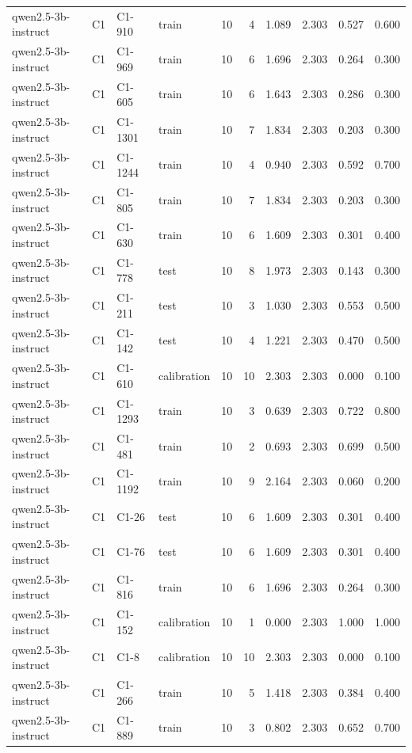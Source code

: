 \begin{table}
\begin{tabular}{llllrrrrrr}
qwen2.5-3b-instruct & C1 & C1-910 & train & 10 & 4 & 1.089 & 2.303 & 0.527 & 0.600 \\
qwen2.5-3b-instruct & C1 & C1-969 & train & 10 & 6 & 1.696 & 2.303 & 0.264 & 0.300 \\
qwen2.5-3b-instruct & C1 & C1-605 & train & 10 & 6 & 1.643 & 2.303 & 0.286 & 0.300 \\
qwen2.5-3b-instruct & C1 & C1-1301 & train & 10 & 7 & 1.834 & 2.303 & 0.203 & 0.300 \\
qwen2.5-3b-instruct & C1 & C1-1244 & train & 10 & 4 & 0.940 & 2.303 & 0.592 & 0.700 \\
qwen2.5-3b-instruct & C1 & C1-805 & train & 10 & 7 & 1.834 & 2.303 & 0.203 & 0.300 \\
qwen2.5-3b-instruct & C1 & C1-630 & train & 10 & 6 & 1.609 & 2.303 & 0.301 & 0.400 \\
qwen2.5-3b-instruct & C1 & C1-778 & test & 10 & 8 & 1.973 & 2.303 & 0.143 & 0.300 \\
qwen2.5-3b-instruct & C1 & C1-211 & test & 10 & 3 & 1.030 & 2.303 & 0.553 & 0.500 \\
qwen2.5-3b-instruct & C1 & C1-142 & test & 10 & 4 & 1.221 & 2.303 & 0.470 & 0.500 \\
qwen2.5-3b-instruct & C1 & C1-610 & calibration & 10 & 10 & 2.303 & 2.303 & 0.000 & 0.100 \\
qwen2.5-3b-instruct & C1 & C1-1293 & train & 10 & 3 & 0.639 & 2.303 & 0.722 & 0.800 \\
qwen2.5-3b-instruct & C1 & C1-481 & train & 10 & 2 & 0.693 & 2.303 & 0.699 & 0.500 \\
qwen2.5-3b-instruct & C1 & C1-1192 & train & 10 & 9 & 2.164 & 2.303 & 0.060 & 0.200 \\
qwen2.5-3b-instruct & C1 & C1-26 & test & 10 & 6 & 1.609 & 2.303 & 0.301 & 0.400 \\
qwen2.5-3b-instruct & C1 & C1-76 & test & 10 & 6 & 1.609 & 2.303 & 0.301 & 0.400 \\
qwen2.5-3b-instruct & C1 & C1-816 & train & 10 & 6 & 1.696 & 2.303 & 0.264 & 0.300 \\
qwen2.5-3b-instruct & C1 & C1-152 & calibration & 10 & 1 & 0.000 & 2.303 & 1.000 & 1.000 \\
qwen2.5-3b-instruct & C1 & C1-8 & calibration & 10 & 10 & 2.303 & 2.303 & 0.000 & 0.100 \\
qwen2.5-3b-instruct & C1 & C1-266 & train & 10 & 5 & 1.418 & 2.303 & 0.384 & 0.400 \\
qwen2.5-3b-instruct & C1 & C1-889 & train & 10 & 3 & 0.802 & 2.303 & 0.652 & 0.700 \\

\end{tabular}
\end{table}
